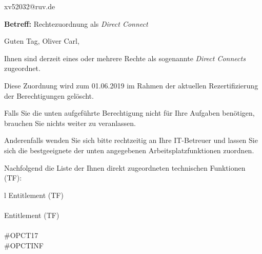 \documentclass[a4paper,landscape,12pt]{letter}
\begin{document}
\begin{letter}{xv52032@ruv.de\hfill \break}
\begin{normalsize}
	\opening{\textbf{Betreff:} Rechtezuordnung als \emph{Direct Connect}}
	\begin{normalsize} \hfill
	\end{normalsize}

	\begin{normalsize}
		Guten Tag, 
	Oliver Carl, \hfill \break
	\end{normalsize}
	\end{normalsize}
	
\begin{normalsize}
	Ihnen sind derzeit eines oder mehrere Rechte als sogenannte \emph{Direct Connects} zugeordnet.
	
	Diese Zuordnung wird zum 01.06.2019 im Rahmen der aktuellen Rezertifizierung der Berechtigungen gelöscht.
	
	Falls Sie die unten aufgeführte Berechtigung nicht für Ihre Aufgaben benötigen, 
	brauchen Sie nichts weiter zu veranlassen.
	
	Anderenfalls wenden Sie sich bitte rechtzeitig an Ihre IT-Betreuer 
	und lassen Sie sich die bestgeeignete der unten angegebenen Arbeitsplatzfunktionen zuordnen.
	\end{normalsize}
	
\begin{normalsize}
	Nachfolgend die Liste der Ihnen direkt zugeordneten technischen Funktionen (TF):

	\begin{longtable}{l}
		Entitlement (TF) \\ \hline
		\endfirsthead
		\\\hline
		Entitlement (TF) \\ \hline
		\endhead %
		\multicolumn{1}{r@{}}{Fortsetzung \ldots}\\
		\endfoot
		\hline
		\endlastfoot
	\#OPCT17\\\#OPCTINF\\
	\end{longtable}
	\end{normalsize}
	

\end{letter}
\end{document}
